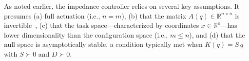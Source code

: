 As noted earlier, the impedance controller relies on several key assumptions. It presumes (a) full actuation (i.e., $n = m$), (b) that the matrix $A(q) \in \mathbb{R}^{n \times n}$ is invertible~\citep{della2020model}, (c) that the task space—characterized by coordinates $x \in \mathbb{R}^{o}$—has lower dimensionality than the configuration space (i.e., $m \leq n$), and (d) that the null space is asymptotically stable, a condition typically met when $K(q) = S \, q$ with $S \succ 0$ and $D \succ 0$.

